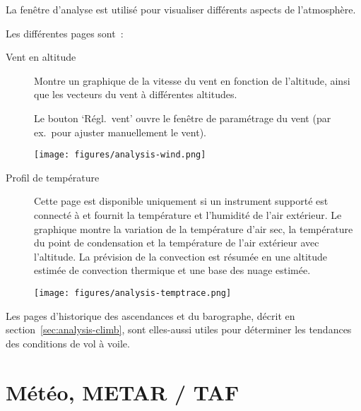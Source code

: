 La fenêtre d'analyse est utilisé pour visualiser différents aspects de l'atmosphère.

Les différentes pages sont~:
\begin{description}

\item[Vent en altitude]
Montre un graphique de la vitesse du vent en fonction de l'altitude, ainsi que les vecteurs du vent à différentes altitudes.

Le bouton `Régl.\ vent' ouvre le fenêtre de paramétrage du vent (par ex.\ pour ajuster manuellement le vent).

\begin{center}
\texttt{[image: figures/analysis-wind.png]}
\end{center}

\item[Profil de température]
Cette page est disponible uniquement si un instrument supporté est connecté à \xc{} et fournit la température et l'humidité de l'air extérieur.
Le graphique montre la variation de la température d'air sec, la température du point de condensation et la température de l'air extérieur avec l'altitude.
La prévision de la convection est résumée en une altitude estimée de convection thermique et une base des nuage estimée.

\begin{center}
\texttt{[image: figures/analysis-temptrace.png]}
\end{center}

\end{description}
Les pages d'historique des ascendances et du barographe, décrit en section~\ref{sec:analysis-climb}, sont elles-aussi utiles pour déterminer les tendances des conditions de vol à voile.

\section{Météo, METAR / TAF}\label{sec:metar-taf}

